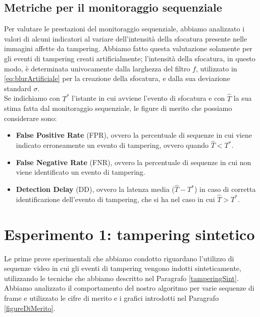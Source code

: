 \subsection{Metriche per il monitoraggio sequenziale}
Per valutare le prestazioni del monitoraggio sequenziale, abbiamo analizzato i valori di alcuni indicatori al variare dell'intensit\`a della sfocatura presente nelle immagini affette da tampering.
Abbiamo fatto questa valutazione solamente per gli eventi di tampering creati artificialmente; l'intensit\`a della sfocatura, in questo modo, \`e determinata univocamente dalla larghezza del filtro $f$, utilizzato in \eqref{eq:blurArtificiale} per la creazione della sfocatura, e dalla sua deviazione standard $\sigma$.\\
Se indichiamo con $T^*$ l'istante in cui avviene l'evento di sfocatura e con $\widehat{T}$ la sua stima fatta dal monitoraggio sequenziale, le figure di merito che possiamo considerare sono:
\begin{itemize}
	\item \textbf{False Positive Rate} (FPR), ovvero la percentuale di sequenze in cui viene indicato erroneamente un evento di tampering, ovvero quando $\widehat{T}<T^*$.
	\item \textbf{False Negative Rate} (FNR), ovvero la percentuale di sequenze in cui non viene identificato un evento di tampering.
	\item \textbf{Detection Delay} (DD), ovvero la latenza media ($\widehat{T} - T^*$) in caso di corretta identificazione dell'evento di tampering, che si ha nel caso in cui $\widehat{T}>T^*$.
\end{itemize}

\section{Esperimento 1: tampering sintetico}
\label{esp1}
Le prime prove sperimentali che abbiamo condotto riguardano l'utilizzo di sequenze video in cui gli eventi di tampering vengono indotti sinteticamente, utilizzando le tecniche che abbiamo descritto nel Paragrafo \ref{tamperingSint}.
Abbiamo analizzato il comportamento del nostro algoritmo per varie sequenze di frame e utilizzato le cifre di merito e i grafici introdotti nel Paragrafo \ref{figureDiMerito}.
